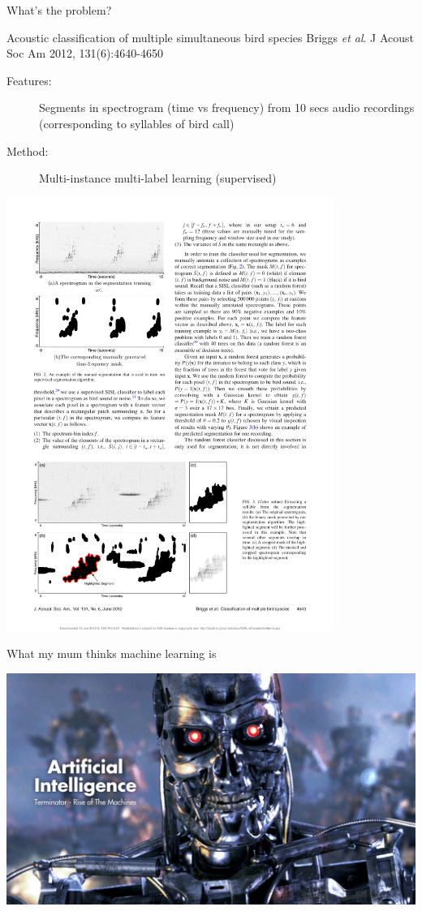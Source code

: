 \documentclass[pdf]{beamer}
\begin{document}
\begin{frame}{What's the problem?}
\begin{exampleblock}{Acoustic classification of multiple simultaneous bird species \vskip-1mm{\tiny Briggs \textit{et al}. J Acoust Soc Am 2012, 131(6):4640-4650}}
\begin{description}
	\item[Features:] Segments in spectrogram (time vs frequency) from 10 secs audio recordings (corresponding to syllables of bird call)
	\item[Method:] Multi-instance multi-label learning (supervised)
\end{description}
\begin{center}
	\includegraphics[width=0.8\textwidth]{briggs.pdf}
\end{center}
\end{exampleblock}
\end{frame}
\begin{frame}{What my mum thinks machine learning is}
\begin{center}
	\includegraphics[width=\textwidth]{AI.jpg}
\end{center}
\end{frame}
\end{document}
